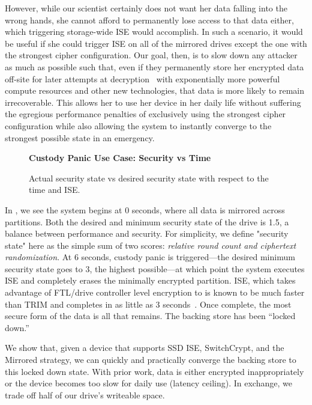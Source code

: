 However, while our scientist certainly does not want her data falling into the
wrong hands, she cannot afford to permanently lose access to that data either,
which triggering storage-wide ISE would accomplish. In such a scenario, it would
be useful if she could trigger ISE on all of the mirrored drives except the one
with the strongest cipher configuration. Our goal, then, is to slow down any
attacker as much as possible such that, even if they permanently store her
encrypted data off-site for later attempts at decryption~\cite{NSA-UTAH} with
exponentially more powerful compute resources and other new technologies, that
data is more likely to remain irrecoverable. This allows her to use her device
in her daily life without suffering the egregious performance penalties of
exclusively using the strongest cipher configuration while also allowing the
system to instantly converge to the strongest possible state in an emergency.

\begin{figure}[ht] \textbf{Custody Panic Use Case: Security vs Time}\par\medskip
   \centering
   {} \caption{Actual security state vs desired
   security state with respect to the time and ISE.}
  \label{fig:usecase-custody}
\end{figure}

In , we see the system begins at 0 seconds, where
all data is mirrored across partitions. Both the desired and minimum security
state of the drive is 1.5, a balance between performance and security. For
simplicity, we define "security state" here as the simple sum of two scores:
\emph{relative round count and ciphertext randomization}. At 6 seconds, custody
panic is triggered---the desired minimum security state goes to 3, the highest
possible---at which point the system executes ISE and completely erases the
minimally encrypted partition. ISE, which takes advantage of FTL/drive
controller level encryption to  is known to be much faster than TRIM and
completes in as little as 3 seconds~\cite{ISE1,ISE2,ISE3}. Once complete, the
most secure form of the data is all that remains. The backing store has been
``locked down.''

We show that, given a device that supports SSD ISE, SwitchCrypt, and the
Mirrored strategy, we can quickly and practically converge the backing store to
this locked down state. With prior work, data is either encrypted
inappropriately or the device becomes too slow for daily use (latency ceiling).
In exchange, we trade off half of our drive's writeable space.
